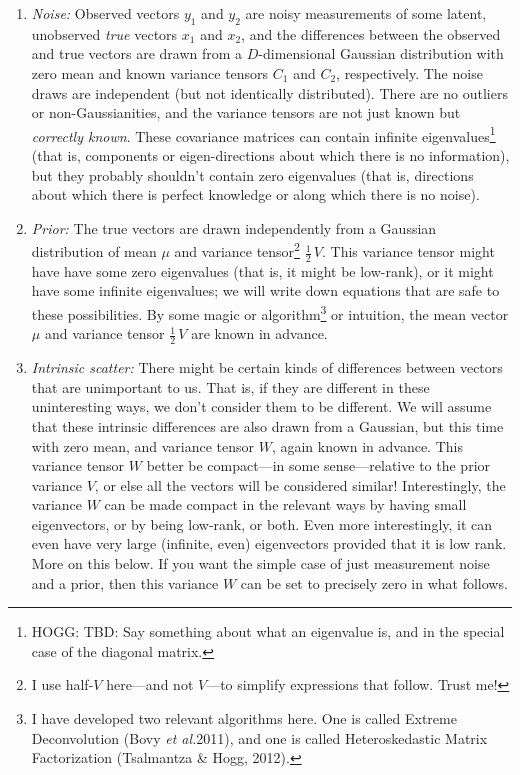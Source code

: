 \documentclass[12pt,letterpaper]{article}
\newcommand{\foreign}[1]{\textsl{#1}}
\newcommand{\etal}{\foreign{et al.}}
\begin{document}
\begin{enumerate}\itemsep0ex
\item \emph{Noise:} Observed vectors $y_1$ and $y_2$ are noisy
  measurements of some latent, unobserved \emph{true} vectors $x_1$
  and $x_2$, and the differences between the observed and true vectors
  are drawn from a $D$-dimensional Gaussian distribution with zero
  mean and known variance tensors $C_1$ and $C_2$, respectively. The
  noise draws are independent (but not identically distributed). There
  are no outliers or non-Gaussianities, and the variance tensors are
  not just known but \emph{correctly known}. These covariance matrices can contain
  infinite eigenvalues\footnote{HOGG: TBD: Say something about what an eigenvalue is,
    and in the special case of the diagonal matrix.} (that is,
  components or eigen-directions about which there is no information),
  but they probably shouldn't contain zero eigenvalues (that is,
  directions about which there is perfect knowledge or along which there is no noise).
\item \emph{Prior:} The true vectors are drawn independently from a
  Gaussian distribution of mean $\mu$ and variance tensor\footnote{%
    I use half-$V$ here---and not $V$---to simplify expressions that follow. Trust me!}
  $\frac{1}{2}\,V$. This variance tensor might have have some zero
  eigenvalues (that is, it might be low-rank), or it might have some
  infinite eigenvalues; we will write down equations that are safe to
  these possibilities. By some magic or algorithm\footnote{I have
    developed two relevant algorithms here. One is called Extreme
    Deconvolution (Bovy \etal 2011), and one is called Heteroskedastic
    Matrix Factorization (Tsalmantza \& Hogg, 2012).} or intuition, the mean vector
  $\mu$ and variance tensor $\frac{1}{2}\,V$ are known in advance.
\item \emph{Intrinsic scatter:} There might be certain kinds of differences
  between vectors that are unimportant to us. That is, if they are
  different in these uninteresting ways, we don't consider them to be
  different. We will assume that these intrinsic differences are also
  drawn from a Gaussian, but this time with zero mean, and variance
  tensor $W$, again known in advance. This variance tensor $W$ better
  be compact---in some sense---relative to the prior variance $V$, or
  else all the vectors will be considered similar! Interestingly, the
  variance $W$ can be made compact in the relevant ways by having
  small eigenvectors, or by being low-rank, or both. Even more
  interestingly, it can even have very large (infinite, even)
  eigenvectors provided that it is low rank. More on this below.
  If you want the simple case of just measurement noise and a prior,
  then this variance $W$ can be set to precisely zero in what follows.
\end{enumerate}
\end{document}
